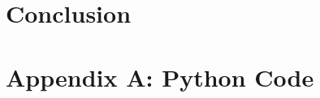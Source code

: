 \documentclass[twocolumn,10pt]{asme2ej}
\begin{document}
\section{Conclusion}

\nocite{*}



\clearpage
\onecolumn
\appendix       %
\section*{Appendix A: Python Code}



\end{document}
